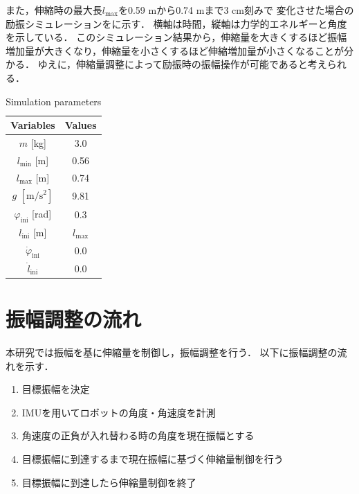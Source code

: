           また，伸縮時の最大長$l_{\mathrm{max}}$を0.59 mから0.74 mまで3 cm刻みで
          変化させた場合の励振シミュレーションをに示す．
          横軸は時間，縦軸は力学的エネルギーと角度を示している．
          このシミュレーション結果から，伸縮量を大きくするほど振幅増加量が大きくなり，伸縮量を小さくするほど伸縮増加量が小さくなることが分かる．
          ゆえに，伸縮量調整によって励振時の振幅操作が可能であると考えられる．
          \begin{table}[tb]
            \begin{center}
              \caption{Simulation parameters}
              \vspace{2mm}
              \begin{tabular}{c|c}
                \hline
                Variables & Values \\
                \hline
                $m$ [kg] & 3.0 \\
                $l_{\mathrm{min}}$ [m] & 0.56 \\
                $l_{\mathrm{max}}$ [m] & 0.74 \\
                $g$ $\mathrm{[m/s^2]}$ & 9.81 \\
                $\varphi_{\mathrm{ini}}$ [rad] & 0.3 \\
                $l_{\mathrm{ini}}$ [m]& $l_{\mathrm{max}}$ \\
                $\dot{\varphi}_{\mathrm{ini}}$ & 0.0 \\
                $\dot{l}_{\mathrm{ini}}$ & 0.0 \\
                \hline
              \end{tabular}
            \end{center}
          \end{table}
        
          
        \newpage
        \section{振幅調整の流れ}

          本研究では振幅を基に伸縮量を制御し，振幅調整を行う．
          以下に振幅調整の流れを示す．
          \begin{enumerate}
            \item 目標振幅を決定
            \item IMUを用いてロボットの角度・角速度を計測
            \item 角速度の正負が入れ替わる時の角度を現在振幅とする
            \item 目標振幅に到達するまで現在振幅に基づく伸縮量制御を行う
            \item 目標振幅に到達したら伸縮量制御を終了
          \end{enumerate}

